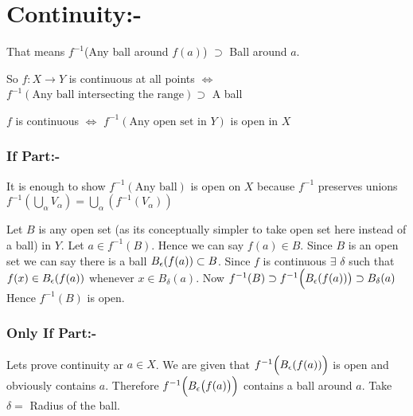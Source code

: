 \section{Continuity:-}
\setlength{\parindent}{0cm}That means $f^{-1}$(Any ball around $f(a)$) $\supset$ Ball around $a$.\setlength{\parindent}{1cm}

So $f:X\to Y$ is continuous at all points $\iff$ $f^{-1}(\text{Any ball intersecting the range})\supset $ A ball
\begin{Theorem}{}{}
	$f$ is continuous $\iff$ $f^{-1}(\text{Any open set in }Y)$ is open in $X$
\end{Theorem}
\begin{myproof}
	\subsubsection*{If Part:-}
	It is enough to show $f^{-1}(\text{Any ball})$ is open on $X$ because $f^{-1}$ preserves unions $f^{-1}\left(\bigcup\limits_{\alpha}V_{\alpha}\right)=\bigcup\limits_{\alpha}\left(f^{-1}(V_{\alpha})\right)$
	
	Let $B$ is any open set (as its conceptually simpler to take open set here instead of a ball) in $Y$. Let $a\in f^{-1}(B)$. Hence we can say $f(a)\in B$. Since $B$ is an open set we can say there is a ball $B_{\epsilon}(f(a))\subset B$. Since $f$ is continuous $\exists$ $\delta $ such that $f(x)\in B_{\epsilon}(f(a))$ whenever $x\in B_{\delta}(a)$. Now $f^{-1}(B)\supset f^{-1}\Big(B_{\epsilon}(f(a))\big)\supset B_{\delta}(a)$ Hence $f^{-1} (B)$ is open. 
	
	\subsubsection*{Only If Part:-}
	Lets prove continuity ar $a\in X$. We are given that $f^{-1}\Big(B_{\epsilon}(f(a))\Big)$ is open and obviously contains $a$. Therefore $f^{-1}\Big(B_{\epsilon}\big(f(a)\big)\Big)$ contains a ball around $a$. Take $\delta=$ Radius of the ball.
\end{myproof}

